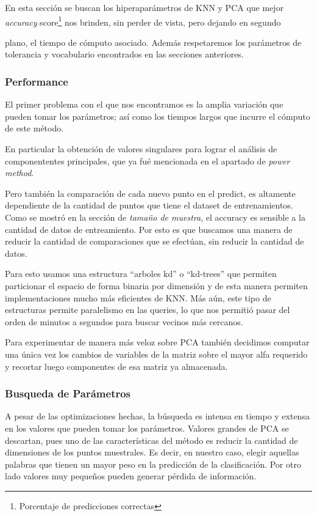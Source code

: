 En esta sección se buscan los hiperaparámetros de KNN y PCA que mejor
\emph{accuracy} score\footnote{Porcentaje de predicciones correctas} nos brinden, sin perder de vista, pero dejando en segundo

plano, el tiempo de cómputo asociado. Además respetaremos los
parámetros de tolerancia y vocabulario encontrados en las secciones
anteriores.

\subsubsection{Performance}

El primer problema con el que nos encontramos es la amplia variación
que pueden tomar los parámetros; así como los tiempos largos que
incurre el cómputo de este método.

En particular la obtención de valores singulares para lograr el
análisis de componententes principales, que ya fué mencionada en el
apartado de \emph{power method}.

Pero también la comparación de cada nuevo punto en el predict, es
altamente dependiente de la cantidad de puntos que tiene el dataset de
entrenamientos. Como se mostró en la sección de \emph{tamaño de
  muestra}, el accuracy es sensible a la cantidad de datos de
entreamiento. Por esto es que buscamos una manera de reducir la
cantidad de comparaciones que se efectúan, sin reducir la cantidad de
datos.

Para esto usamos una estructura ``arboles kd'' o ``kd-trees'' que
permiten particionar el espacio de forma binaria por dimensión y de
esta manera permiten implementaciones mucho más eficientes de KNN. Más aún, este
tipo de estructuras permite paralelismo en las queries, lo que nos permitió
pasar del orden de minutos a segundos para buscar vecinos más cercanos.

Para experimentar de manera más veloz sobre PCA también decidimos computar una
única vez los cambios de variables de la matriz sobre el mayor alfa requerido
y recortar luego componentes de esa matriz ya almacenada.

\subsubsection{Busqueda de Parámetros}

A pesar de las optimizaciones hechas, la búsqueda es intensa en tiempo
y extensa en los valores que pueden tomar los parámetros. Valores
grandes de PCA se descartan, pues uno de las características del
método es reducir la cantidad de dimensiones de los puntos
muestrales. Es decir, en nuestro caso, elegir aquellas palabras que
tienen un mayor peso en la predicción de la clasificación. Por otro
lado valores muy pequeños pueden generar pérdida de información.

